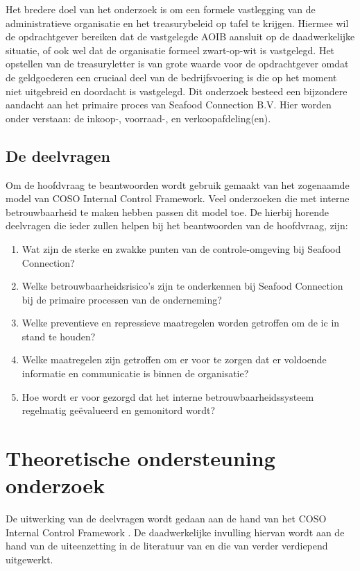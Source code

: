 Het bredere doel van het onderzoek is om een formele vastlegging van de administratieve organisatie en het treasurybeleid op tafel te krijgen. Hiermee wil de opdrachtgever bereiken dat de vastgelegde AOIB aansluit op de daadwerkelijke situatie, of ook wel dat de organisatie formeel zwart-op-wit is vastgelegd. Het opstellen van de \gls{treasuryletter} is van grote waarde voor de opdrachtgever omdat de \gls{geldgoederen} een cruciaal deel van de bedrijfsvoering is die op het moment niet uitgebreid en doordacht is vastgelegd. Dit onderzoek besteed een bijzondere aandacht aan het primaire proces van Seafood Connection B.V. Hier worden onder verstaan: de inkoop-, voorraad-, en verkoopafdeling(en). 

\newpage
\subsection{De deelvragen}
Om de hoofdvraag te beantwoorden wordt gebruik gemaakt van het zogenaamde model van COSO Internal Control Framework. Veel onderzoeken die met interne betrouwbaarheid te maken hebben passen dit model toe. De hierbij horende deelvragen die ieder zullen helpen bij het beantwoorden van de hoofdvraag, zijn:

\begin{enumerate}
    \item Wat zijn de sterke en zwakke punten van de controle-omgeving bij Seafood Connection?
    \item Welke betrouwbaarheidsrisico's zijn te onderkennen bij Seafood Connection bij de primaire processen van de onderneming?
    \item Welke preventieve en repressieve maatregelen worden getroffen om de \gls{ic} in stand te houden?
    \item Welke maatregelen zijn getroffen om er voor te zorgen dat er voldoende informatie en communicatie is binnen de organisatie?
    \item Hoe wordt er voor gezorgd dat het interne betrouwbaarheidssysteem regelmatig geëvalueerd en gemonitord wordt?
\end{enumerate}

\section{Theoretische ondersteuning onderzoek}
\label{hoofdstuk:theoretischeondersteuning}
De uitwerking van de deelvragen wordt gedaan aan de hand van het COSO Internal Control Framework \citep{COSOsummery}. De daadwerkelijke invulling hiervan wordt aan de hand van de uiteenzetting in de literatuur van \citet{bivpraktijk} en die van \citet{bivperspectief} verder verdiepend uitgewerkt. 

